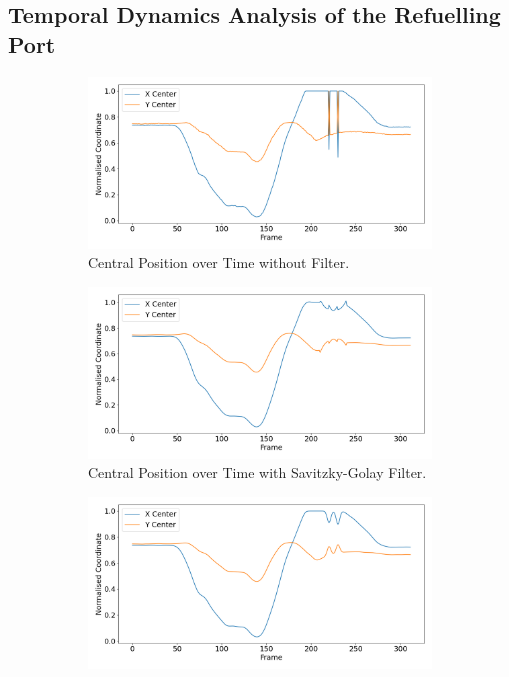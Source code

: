 \documentclass[12pt,oneside]{book} %
\begin{document}
\subsection{Temporal Dynamics Analysis of the Refuelling Port}
\begin{figure}[H]
    \centering
    \begin{subfigure}[t]{0.65\textwidth}
        \includegraphics[width=\textwidth]{figures/bbox_metrics/test_indoor1 (Raw Data)_central_position.png}
        \caption{Central Position over Time without Filter.}
        \label{fig:central-position-test-indoor1-raw}
    \end{subfigure}
    \hfill
    \begin{subfigure}[t]{0.65\textwidth}
        \includegraphics[width=\textwidth]{figures/bbox_metrics/test_indoor1 (Savgol Filter)_central_position.png}
        \caption{Central Position over Time with Savitzky-Golay Filter.}
        \label{fig:central-position-test-indoor1-savgol}
    \end{subfigure}
    \vfill
    \begin{subfigure}[t]{0.65\textwidth}
        \includegraphics[width=\textwidth]{figures/bbox_metrics/test_indoor1 (Gaussian Filter)_central_position.png}

\end{subfigure}
\end{figure}
\end{document}

